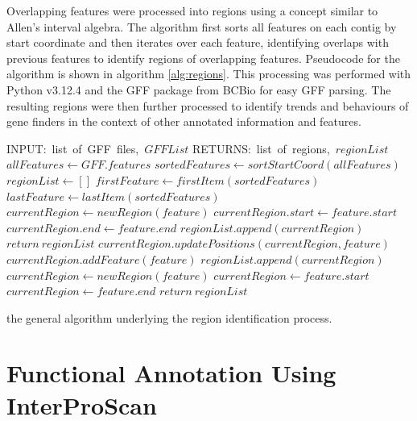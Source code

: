 Overlapping features were processed into regions using a concept
similar to Allen's interval algebra\cite{DECHTER2003333}. The
algorithm first sorts all features on each contig by start coordinate
and then iterates over each feature, identifying overlaps with
previous features to identify regions of overlapping
features. Pseudocode for the algorithm is shown in algorithm
\ref{alg:regions}. This processing was performed with Python
v3.12.4\cite{Foundation} and the GFF package from BCBio\cite{Chapman}
for easy GFF parsing.  The resulting regions were then further
processed to identify trends and behaviours of gene finders in the
context of other annotated information and features.

\begin{algorithm}
  \begin{algorithmic}
    \State INPUT:\ list\ of\ GFF\ files,\ $GFFList$
    \State RETURNS:\ list\ of\ regions,\ $regionList$
    \State $allFeatures \gets GFF.features$
    \EndFor
    \State $sortedFeatures \gets sortStartCoord(allFeatures)$
    \State $regionList \gets []$
    \State $firstFeature \gets firstItem(sortedFeatures)$
    \State $lastFeature \gets lastItem(sortedFeatures)$
        \State $currentRegion \gets newRegion(feature)$
        \State $currentRegion.start \gets feature.start$
        \State $currentRegion.end \gets feature.end$
        \State $regionList.append(currentRegion)$
        \State $return\ regionList$
        \State $currentRegion.updatePositions(currentRegion, feature)$
        \State $currentRegion.addFeature(feature)$
      \Else
        \State $regionList.append(currentRegion)$
        \State $currentRegion \gets newRegion(feature)$
        \State $currentRegion \gets feature.start$
        \State $currentRegion \gets feature.end$
      \EndIf
    \EndFor
    \State $return\ regionList$
  \end{algorithmic}
  \caption{the general algorithm underlying the region identification
    process.}
  \label{alg:regions}
\end{algorithm}

\section{Functional Annotation Using InterProScan}

